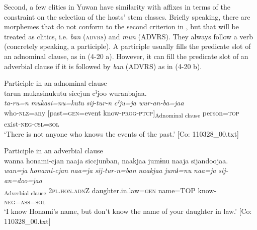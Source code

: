   Second, a few clitics in Yuwan have similarity with affixes in terms of the constraint on the selection of the hosts’ stem classes. Briefly speaking, there are morphemes that do not conform to the second criterion in , but that will be treated as clitics, i.e. \textit{ban} (\textsc{advrs}) and \textit{mun} (ADVRS). They always follow a verb (concretely speaking, a participle). A participle usually fills the predicate slot of an adnominal clause, as in (4-20 a). However, it can fill the predicate slot of an adverbial clause if it is followed by \textit{ban} (ADVRS) as in (4-20 b).

\ea\label{ex:4.20} 

\ea \label{ex:4.20a} Participle in an adnominal clause\\
\glll tarun  mukasinukutu  siccjun     cˀjoo  wuranbajaa.\\
    \textit{ta-ru=n}  \textit{mukasi=nu=kutu}  \textit{sij-tur-n}     \textit{cˀju=ja}  \textit{wur-an-ba=jaa}\\
    who-\textsc{nlz}=any  [past=\textsc{gen}=event  know-\textsc{prog}-\textsc{ptcp}]\textsubscript{Adnominal clause}        person=\textsc{top}  exist-\textsc{neg}-\textsc{csl}=\textsc{sol}\\
    \glt     ‘There is not anyone who knows the events of the past.’ [Co: 110328\_00.txt]

\ex Participle in an adverbial clause\\\label{ex:4.20b}
\glll   wanna  honami-{\textbar}cjan{\textbar}  naaja  siccjunban, naakjaa  jumɨnu  naaja  sijandoojaa.\\
    \textit{wan=ja}  \textit{honami-cjan}  \textit{naa=ja}  \textit{sij-tur-n=ban}  \textit{naakjaa}  \textit{jumɨ=nu}  \textit{naa=ja}  \textit{sij-an=doo=jaa}\\
    [1\textsc{sg}=\textsc{top}  Honami-\textsc{dim}  name=TOP  know-\textsc{prog}-\textsc{ptcp}=\textsc{advrs}]\textsubscript{Adverbial clause}  2\textsc{pl}.\textsc{hon}.\textsc{adn}Z  daughter.in.law=\textsc{gen}  name=TOP  know-\textsc{neg}=\textsc{ass}=\textsc{sol}\\
    \glt     ‘I know Honami’s name, but don’t know the name of your daughter in law.’ [Co: 110328\_00.txt]
    \z
\z

